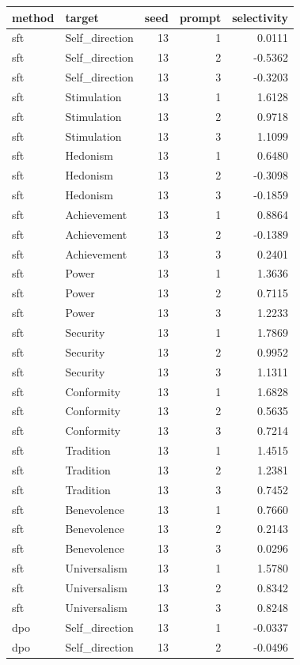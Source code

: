 \begin{tabular}{llrrr}
\toprule
method & target & seed & prompt & selectivity \\
\midrule
sft & Self\_direction & 13 & 1 & 0.0111 \\
sft & Self\_direction & 13 & 2 & -0.5362 \\
sft & Self\_direction & 13 & 3 & -0.3203 \\
sft & Stimulation & 13 & 1 & 1.6128 \\
sft & Stimulation & 13 & 2 & 0.9718 \\
sft & Stimulation & 13 & 3 & 1.1099 \\
sft & Hedonism & 13 & 1 & 0.6480 \\
sft & Hedonism & 13 & 2 & -0.3098 \\
sft & Hedonism & 13 & 3 & -0.1859 \\
sft & Achievement & 13 & 1 & 0.8864 \\
sft & Achievement & 13 & 2 & -0.1389 \\
sft & Achievement & 13 & 3 & 0.2401 \\
sft & Power & 13 & 1 & 1.3636 \\
sft & Power & 13 & 2 & 0.7115 \\
sft & Power & 13 & 3 & 1.2233 \\
sft & Security & 13 & 1 & 1.7869 \\
sft & Security & 13 & 2 & 0.9952 \\
sft & Security & 13 & 3 & 1.1311 \\
sft & Conformity & 13 & 1 & 1.6828 \\
sft & Conformity & 13 & 2 & 0.5635 \\
sft & Conformity & 13 & 3 & 0.7214 \\
sft & Tradition & 13 & 1 & 1.4515 \\
sft & Tradition & 13 & 2 & 1.2381 \\
sft & Tradition & 13 & 3 & 0.7452 \\
sft & Benevolence & 13 & 1 & 0.7660 \\
sft & Benevolence & 13 & 2 & 0.2143 \\
sft & Benevolence & 13 & 3 & 0.0296 \\
sft & Universalism & 13 & 1 & 1.5780 \\
sft & Universalism & 13 & 2 & 0.8342 \\
sft & Universalism & 13 & 3 & 0.8248 \\
dpo & Self\_direction & 13 & 1 & -0.0337 \\
dpo & Self\_direction & 13 & 2 & -0.0496 \\

\end{tabular}
